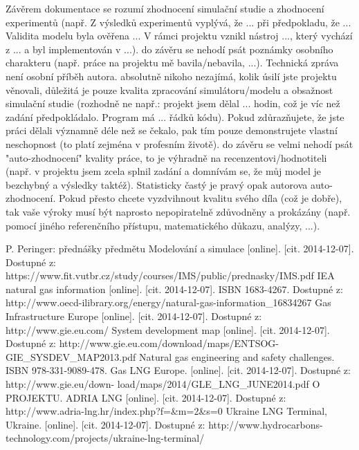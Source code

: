 \documentclass[a4paper,11pt]{article}
\begin{document}
Závěrem dokumentace se rozumí zhodnocení simulační studie a zhodnocení experimentů (např. Z výsledků experimentů vyplývá, že ... při předpokladu, že ... Validita modelu byla ověřena ... V rámci projektu vznikl nástroj ..., který vychází z ... a byl implementován v ...).
do závěru se nehodí psát poznámky osobního charakteru (např. práce na projektu mě bavila/nebavila, ...). Technická zpráva není osobní příběh autora.
absolutně nikoho nezajímá, kolik úsilí jste projektu věnovali, důležitá je pouze kvalita zpracování simulátoru/modelu a obsažnost simulační studie (rozhodně ne např.: projekt jsem dělal ... hodin, což je víc než zadání předpokládalo. Program má ... řádků kódu). Pokud zdůrazňujete, že jste práci dělali významně déle než se čekalo, pak tím pouze demonstrujete vlastní neschopnost (to platí zejména v profesním životě).
do závěru se velmi nehodí psát "auto-zhodnocení" kvality práce, to je výhradně na recenzentovi/hodnotiteli (např. v projektu jsem zcela splnil zadání a domnívám se, že můj model je bezchybný a výsledky taktéž). Statisticky častý je pravý opak autorova auto-zhodnocení. Pokud přesto chcete vyzdvihnout kvalitu svého díla (což je dobře), tak vaše výroky musí být naprosto nepopiratelně zdůvodněny a prokázány (např. pomocí jiného referenčního přístupu, matematického důkazu, analýzy, ...).


\newpage
\renewcommand{\refname}{Literatura a použité zdroje}
\begin{thebibliography}{99}
P. Peringer: přednášky předmětu Modelování a simulace [online]. [cit. 2014-12-07]. Dostupné z:
https://www.fit.vutbr.cz/study/courses/IMS/public/prednasky/IMS.pdf	
 IEA natural gas information [online]. [cit. 2014-12-07]. ISBN 1683-4267. Dostupné z: http://www.oecd-ilibrary.org/energy/natural-gas-information{\_}16834267
 Gas Infrastructure Europe [online]. [cit. 2014-12-07]. Dostupné z: http://www.gie.eu.com/
 System development map [online]. [cit. 2014-12-07]. Dostupné z: http://www.gie.eu.com/download/maps/ENTSOG-GIE{\_}SYSDEV{\_}MAP2013.pdf
 Natural gas engineering and safety challenges. ISBN 978-331-9089-478.
Gas LNG Europe. [online]. [cit. 2014-12-07]. Dostupné z: http://www.gie.eu/down-
load/maps/2014/GLE{\_}LNG{\_}JUNE2014.pdf
O PROJEKTU. ADRIA LNG [online]. [cit. 2014-12-07]. Dostupné z: http://www.adria-lng.hr/index.php?f={\&}m=2{\&}s=0
Ukraine LNG Terminal, Ukraine. [online]. [cit. 2014-12-07]. Dostupné z: http://www.hydrocarbons-technology.com/projects/ukraine-lng-terminal/
\end{thebibliography}
\end{document}
